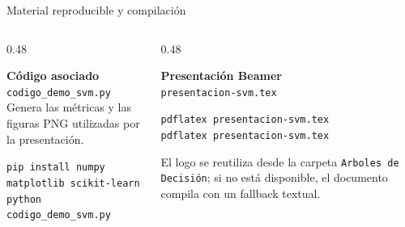 \begin{frame}{Material reproducible y compilación}
\small
\begin{columns}[T,onlytextwidth]
\begin{column}{0.48\textwidth}
\begin{ccdebox}
\textbf{Código asociado}\\[0.10cm]
\texttt{codigo\_demo\_svm.py}\\[0.10cm]
Genera las métricas y las figuras PNG utilizadas por la presentación.
\end{ccdebox}
\vspace{0.14cm}
\begin{keybox}
\texttt{pip install numpy matplotlib scikit-learn}\\[0.08cm]
\texttt{python codigo\_demo\_svm.py}
\end{keybox}
\end{column}
\begin{column}{0.48\textwidth}
\begin{ccdebox}
\textbf{Presentación Beamer}\\[0.10cm]
\texttt{presentacion-svm.tex}
\end{ccdebox}
\vspace{0.14cm}
\begin{keybox}
\texttt{pdflatex presentacion-svm.tex}\\[0.08cm]
\texttt{pdflatex presentacion-svm.tex}
\end{keybox}
\vspace{0.14cm}
\begin{ccdebox}
\footnotesize
El logo se reutiliza desde la carpeta \texttt{Arboles de Decisión}; si no está disponible, el documento compila con un fallback textual.
\end{ccdebox}
\end{column}
\end{columns}
\end{frame}
